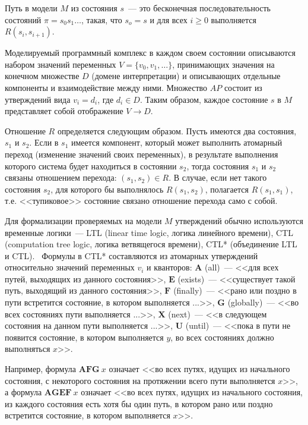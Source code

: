 \documentclass[12pt,a4paper,fleqn]{article}
\begin{document}
Путь в модели $M$ из состояния $s$~--- это бесконечная последовательность состояний $\pi = s_0 s_1 \ldots$, такая, что
$s_o = s$ и для всех $i \geq 0$ выполняется $R(s_i, s_{i+1})$.

Моделируемый программный комплекс в каждом своем состоянии описываются набором значений переменных $V = \{v_0, v_1,
\ldots\}$, принимающих значения на конечном множестве $D$ (домене интерпретации) и описывающих отдельные компоненты и
взаимодействие между ними. Множество $AP$ состоит из утверждений вида $v_i = d_i$, где $d_i \in D$. Таким образом,
каждое состояние $s$ в $M$ представляет собой отображение $V \rightarrow D$.

Отношение $R$ определяется следующим образом. Пусть имеются два состояния, $s_1$ и $s_2$. Если в $s_1$ имеется
компонент, который может выполнить атомарный переход (изменение значений своих переменных), в результате выполнения
которого система будет находиться в состоянии $s_2$, тогда состояния $s_1$ и $s_2$ связаны отношением перехода: $(s_1,
s_2) \in R$. В случае, если нет такого состояния $s_2$, для которого бы выполнялось $R(s_1, s_2)$, полагается $R(s_1,
s_1)$, т.е. <<тупиковое>> состояние связано отношение перехода само с собой.

Для формализации проверяемых на модели $M$ утверждений обычно используются временные логики~--- LTL (linear time logic,
логика линейного времени), CTL (computation tree logic, логика ветвящегося времени), CTL* (объединение LTL и
CTL).~\cite{Clarke, Velder} Формулы в CTL* составляются из атомарных утверждений относительно значений переменных $v_i$
и кванторов: $\mathbf{A}$ (all)~--- <<для всех путей, выходящих из данного состояния>>, $\mathbf{E}$ (exists)~---
<<существует такой путь, выходящий из данного состояния>>, $\mathbf{F}$ (finally)~--- <<рано или поздно в пути
встретится состояние, в котором выполняется ...>>, $\mathbf{G}$ (globally)~--- <<во всех состояниях пути выполняется
...>>, $\mathbf{X}$ (next)~--- <<в следующем состояния на данном пути выполняется ...>>, $\mathbf{U}$ (until)~--- <<пока
в пути не появится состояние, в котором выполняется $y$, во всех состояниях должно выполняться $x$>>.

Например, формула $\mathbf{AFG}~x$ означает <<во всех путях, идущих из начального состояния, с некоторого состояния на протяжении всего
пути выполняется $x$>>, а формула $\mathbf{AGEF}~x$ означает <<во всех путях, идущих из начального состояния, из каждого состояния есть хотя бы
один путь, в котором рано или поздно встретится состояние, в котором выполняется $x$>>.
\end{document}
